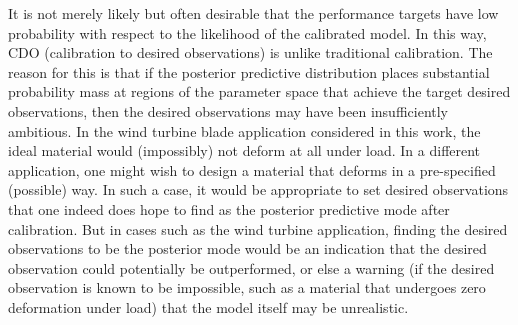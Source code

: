 \documentclass[12pt]{article}
\begin{document}
It is not merely likely but often desirable that the performance targets have low probability with respect to the likelihood of the calibrated model. 
%
In this way, CDO (calibration to desired observations) is unlike traditional calibration. 
%
The reason for this is that if the posterior predictive distribution places substantial probability mass at regions of the parameter space that achieve the target desired observations, then the desired observations may have been insufficiently ambitious. 
%
In the wind turbine blade application considered in this work, the ideal material would (impossibly) not deform at all under load.
In a different application, one might wish to design a material that deforms in a pre-specified (possible) way. 
In such a case, it would be appropriate to set desired observations that one indeed does hope to find as the posterior predictive mode after calibration. 
%
But in cases such as the wind turbine application, finding the desired observations to be the posterior mode would be an indication that the desired observation could potentially be outperformed, or else a warning (if the desired observation is known to be impossible, such as a material that undergoes zero deformation under load) that the model itself may be unrealistic. 
%

%
\end{document}
